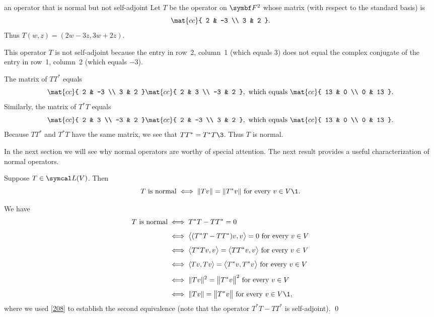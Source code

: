 \begin{example}[normalnotsa]{an operator that is normal but not self-adjoint}
{Let $T$ be the operator on $\F{2}$ whose matrix (with respect to the standard basis) is
\[ \addtolength{\abovedisplayshortskip}{-1.5bp}
\mat{cc}{
2 & -3 \\
3 & 2 }.
\]
Thus $T(w, z) = (2w-3z, 3w + 2z)$.
}

\pagebreak[3]

This operator $T$ is not self-adjoint because the entry in row~2, column~1 (which equals $3$) does not equal the complex conjugate of the entry in row~1, column~2 (which equals $-3$).

The matrix of $TT^*$ equals
\[
\mat{cc}{
2 & -3 \\
3 & 2 } \mat{cc}{
2 & 3 \\
-3 & 2 },
\text{\ which equals\ }
\mat{cc}{
13 & 0 \\
0 & 13 }.
\]
Similarly, the matrix of $T^*T$ equals
\[
\mat{cc}{
2 & 3 \\
-3 & 2 }
\mat{cc}{
2 & -3 \\
3 & 2 },
\text{\ which equals\ }
\mat{cc}{
13 & 0 \\
0 & 13 }.
\]
Because $TT^*$ and $T^*T$ have the same matrix, we see that $TT^* = T^*T\3$. Thus $T$ is normal.
\end{example}

In the next section we will see why normal operators are worthy of special attention. The next result provides a useful characterization of normal operators.

{Suppose $T \in \L(V)$. Then
\[
T \text{ is normal} \iff \|Tv\| = \|T^*v\| \text{ for every } v \in V\1.
\]}

\proof
We have
\begin{align*}
T \text{\ is normal}  &\iff T^*T - TT^* = 0 \\[4bp]
&\iff \ip[\big]{(T^*T - TT^*)v, v} = 0 \text{ for every } v \in V\\[4bp]
&\iff \ip[\big]{T^*T v, v} = \ip[\big]{TT^* v, v} \text{ for every } v \in V\\[4bp]
&\iff \ip{T v, Tv} = \ip[\big]{T^* v, T^*v} \text{ for every } v \in V\\[4bp]
&\iff \|Tv\|^2 = \norm[\big]{T^*v}^2 \text{ for every } v\in V \\[4bp]
&\iff \|Tv\| = \norm[\big]{T^*v} \text{ for every } v\in V\1,
\end{align*}
where we used \ref{208} to establish the second equivalence (note that the
operator $T^*T - TT^*$ is self-adjoint).
\qed

